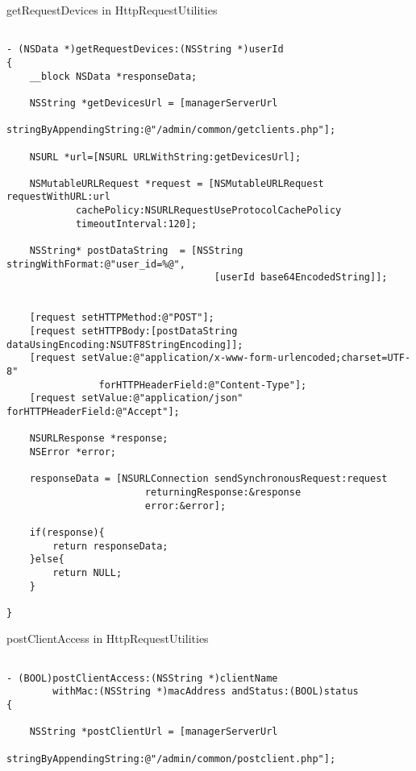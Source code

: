 \begin{appendices}
\begin{algorithm}[h]
\begin{verbatim}
 \end{verbatim}
\end{algorithm}

\begin{algorithm}[h]
  \caption{getRequestDevices in HttpRequestUtilities}
  \label{code:ios_http_getrequests}
  \begin{verbatim}
  
- (NSData *)getRequestDevices:(NSString *)userId
{
    __block NSData *responseData;
    
    NSString *getDevicesUrl = [managerServerUrl 
    			stringByAppendingString:@"/admin/common/getclients.php"];
    
    NSURL *url=[NSURL URLWithString:getDevicesUrl];
    
    NSMutableURLRequest *request = [NSMutableURLRequest requestWithURL:url
     		cachePolicy:NSURLRequestUseProtocolCachePolicy 
     		timeoutInterval:120];
    
    NSString* postDataString  = [NSString stringWithFormat:@"user_id=%@",
    								[userId base64EncodedString]];
    
    
    [request setHTTPMethod:@"POST"];
    [request setHTTPBody:[postDataString dataUsingEncoding:NSUTF8StringEncoding]];
    [request setValue:@"application/x-www-form-urlencoded;charset=UTF-8" 
    			forHTTPHeaderField:@"Content-Type"];
    [request setValue:@"application/json" forHTTPHeaderField:@"Accept"];
    
    NSURLResponse *response;
    NSError *error;
    
    responseData = [NSURLConnection sendSynchronousRequest:request 
    					returningResponse:&response 
    					error:&error];
    
    if(response){
        return responseData;
    }else{
        return NULL;
    }
    
}

 \end{verbatim}
\end{algorithm}

\begin{algorithm}[h]
  \caption{postClientAccess in HttpRequestUtilities}
  \label{code:ios_http_postclient}
  \begin{verbatim}
  
- (BOOL)postClientAccess:(NSString *)clientName 
		withMac:(NSString *)macAddress andStatus:(BOOL)status
{
    
    NSString *postClientUrl = [managerServerUrl 
    			stringByAppendingString:@"/admin/common/postclient.php"];
    

\end{verbatim}
\end{algorithm}
\end{appendices}
